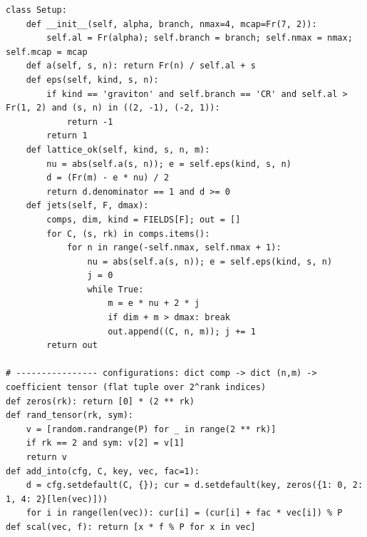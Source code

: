\documentclass[10pt]{article}
\begin{document}
\begin{lstlisting}
class Setup:
    def __init__(self, alpha, branch, nmax=4, mcap=Fr(7, 2)):
        self.al = Fr(alpha); self.branch = branch; self.nmax = nmax; self.mcap = mcap
    def a(self, s, n): return Fr(n) / self.al + s
    def eps(self, kind, s, n):
        if kind == 'graviton' and self.branch == 'CR' and self.al > Fr(1, 2) and (s, n) in ((2, -1), (-2, 1)):
            return -1
        return 1
    def lattice_ok(self, kind, s, n, m):
        nu = abs(self.a(s, n)); e = self.eps(kind, s, n)
        d = (Fr(m) - e * nu) / 2
        return d.denominator == 1 and d >= 0
    def jets(self, F, dmax):
        comps, dim, kind = FIELDS[F]; out = []
        for C, (s, rk) in comps.items():
            for n in range(-self.nmax, self.nmax + 1):
                nu = abs(self.a(s, n)); e = self.eps(kind, s, n)
                j = 0
                while True:
                    m = e * nu + 2 * j
                    if dim + m > dmax: break
                    out.append((C, n, m)); j += 1
        return out

# ---------------- configurations: dict comp -> dict (n,m) -> coefficient tensor (flat tuple over 2^rank indices)
def zeros(rk): return [0] * (2 ** rk)
def rand_tensor(rk, sym):
    v = [random.randrange(P) for _ in range(2 ** rk)]
    if rk == 2 and sym: v[2] = v[1]
    return v
def add_into(cfg, C, key, vec, fac=1):
    d = cfg.setdefault(C, {}); cur = d.setdefault(key, zeros({1: 0, 2: 1, 4: 2}[len(vec)]))
    for i in range(len(vec)): cur[i] = (cur[i] + fac * vec[i]) % P
def scal(vec, f): return [x * f % P for x in vec]


\end{lstlisting}
\end{document}
